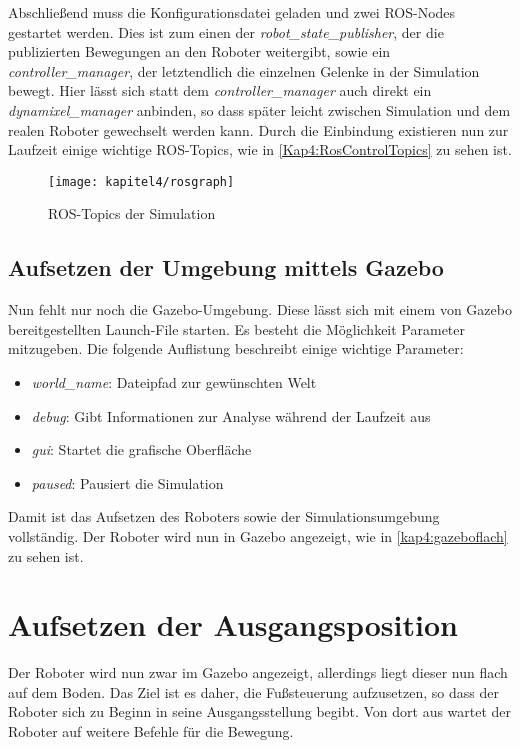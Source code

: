 \begin{itemize}
Abschließend muss die Konfigurationsdatei geladen und zwei \ac{ROS}-Nodes gestartet werden. Dies ist zum einen der \emph{robot\_state\_publisher}, der die publizierten Bewegungen an den Roboter weitergibt, sowie ein \emph{controller\_manager}, der letztendlich die einzelnen Gelenke in der Simulation bewegt. Hier lässt sich statt dem \emph{controller\_manager} auch direkt ein \emph{dynamixel\_manager} anbinden, so dass später leicht zwischen Simulation und dem realen Roboter gewechselt werden kann. Durch die Einbindung existieren nun zur Laufzeit einige wichtige \ac{ROS}-Topics, wie in \autoref{Kap4:RosControlTopics} zu sehen ist.

\begin{figure}[p!]
  \centering
  \texttt{[image: kapitel4/rosgraph]}
  \caption{ROS-Topics der Simulation}
  \label{Kap4:RosControlTopics}
\end{figure}

\subsection{Aufsetzen der Umgebung mittels Gazebo}

Nun fehlt nur noch die Gazebo-Umgebung. Diese lässt sich mit einem von Gazebo bereitgestellten Launch-File starten. Es besteht die Möglichkeit Parameter mitzugeben. Die folgende Auflistung beschreibt einige wichtige Parameter:
\begin{itemize}
  \item \emph{world\_name}: Dateipfad zur gewünschten Welt
  \item \emph{debug}: Gibt Informationen zur Analyse während der Laufzeit aus
  \item \emph{gui}: Startet die grafische Oberfläche
  \item \emph{paused}: Pausiert die Simulation
\end{itemize}

Damit ist das Aufsetzen des Roboters sowie der Simulationsumgebung vollständig. Der Roboter wird nun in Gazebo angezeigt, wie in \autoref{kap4:gazeboflach} zu sehen ist.

\section{Aufsetzen der Ausgangsposition}

Der Roboter wird nun zwar im Gazebo angezeigt, allerdings liegt dieser nun flach auf dem Boden. Das Ziel ist es daher, die Fußsteuerung aufzusetzen, so dass der Roboter sich zu Beginn in seine Ausgangsstellung begibt. Von dort aus wartet der Roboter auf weitere Befehle für die Bewegung.


\end{itemize}
